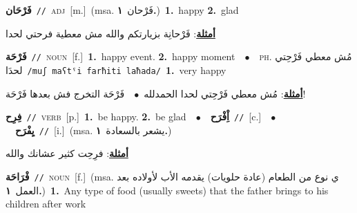 \documentclass[10pt,a4paper,twoside]{article} %
\begin{document}
\begin{multicols}{2}
{\setlength\topsep{0pt}\textbf{\foreignlanguage{arabic}{فَرْحَان}}\ {\color{gray}\texttt{//}\color{black}}\ \textsc{adj}\ [m.]\ \color{gray}(msa. \foreignlanguage{arabic}{فَرْحان}~\foreignlanguage{arabic}{\textbf{١.}})\color{black}\ \textbf{1.}~happy  \textbf{2.}~glad\  \begin{flushright}\color{gray}\foreignlanguage{arabic}{\textbf{\underline{\foreignlanguage{arabic}{أمثلة}}}: فَرْحانِة بزيارتكم والله مش معطية فرحتي لحدا}\end{flushright}\color{black}} \vspace{2mm}

{\setlength\topsep{0pt}\textbf{\foreignlanguage{arabic}{فَرْحَة}}\ {\color{gray}\texttt{//}\color{black}}\ \textsc{noun}\ [f.]\ \textbf{1.}~happy event.  \textbf{2.}~happy moment\ \ $\bullet$\ \ \textsc{ph.} \color{gray} \foreignlanguage{arabic}{مُش معطي فَرْحِتي لحدَا}\color{black}\ {\color{gray}\texttt{/{\sffamily muʃ maʕtˤi farħiti laħada}/}\color{black}}\ \textbf{1.}~very happy\  \begin{flushright}\color{gray}\foreignlanguage{arabic}{\textbf{\underline{\foreignlanguage{arabic}{أمثلة}}}: مُش معطي فَرْحِتي لحدا الحمدلله\ $\bullet$\ \  فَرْحَة التخرج فش بعدها فَرْحَة!}\end{flushright}\color{black}} \vspace{2mm}

{\setlength\topsep{0pt}\textbf{\foreignlanguage{arabic}{فِرِح}}\ {\color{gray}\texttt{//}\color{black}}\ \textsc{verb}\ [p.]\ \textbf{1.}~be happy.  \textbf{2.}~be glad\ \ $\bullet$\ \ \setlength\topsep{0pt}\textbf{\foreignlanguage{arabic}{اِْفْرَح}}\ {\color{gray}\texttt{//}\color{black}}\ [c.]\ \ $\bullet$\ \ \setlength\topsep{0pt}\textbf{\foreignlanguage{arabic}{يِفْرَح}}\ {\color{gray}\texttt{//}\color{black}}\ [i.]\ \color{gray}(msa. \foreignlanguage{arabic}{يشعر بالسعادة}~\foreignlanguage{arabic}{\textbf{١.}})\color{black}\  \begin{flushright}\color{gray}\foreignlanguage{arabic}{\textbf{\underline{\foreignlanguage{arabic}{أمثلة}}}: فرِحِت كثير عشانك والله}\end{flushright}\color{black}} \vspace{2mm}

{\setlength\topsep{0pt}\textbf{\foreignlanguage{arabic}{فْرَاحَة}}\ {\color{gray}\texttt{//}\color{black}}\ \textsc{noun}\ [f.]\ \color{gray}(msa. \foreignlanguage{arabic}{ي نوع من الطعام (عادة حلويات) يقدمه الأب لأولاده بعد العمل}~\foreignlanguage{arabic}{\textbf{١.}})\color{black}\ \textbf{1.}~Any type of food (usually sweets) that the father brings to his children after work\ } \vspace{2mm}


\end{multicols}
\end{document}
